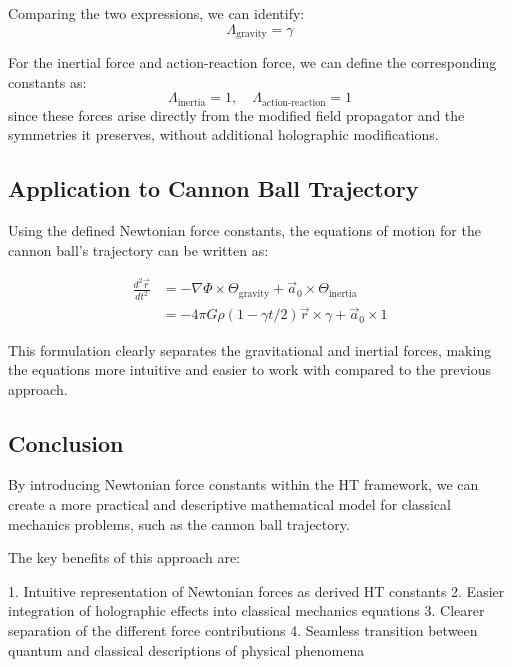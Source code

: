 \documentclass{article}
\theoremstyle{plain}
\theoremstyle{definition}
\theoremstyle{remark}
\begin{document}
Comparing the two expressions, we can identify:
\begin{equation}
\Lambda_\text{gravity} = \gamma
\end{equation}

For the inertial force and action-reaction force, we can define the corresponding constants as:
\begin{equation}
\Lambda_\text{inertia} = 1, \quad \Lambda_\text{action-reaction} = 1
\end{equation}
since these forces arise directly from the modified field propagator and the symmetries it preserves, without additional holographic modifications.

\subsection{Application to Cannon Ball Trajectory}

Using the defined Newtonian force constants, the equations of motion for the cannon ball's trajectory can be written as:

\begin{align}
\frac{d^2\vec{r}}{dt^2} &= -\nabla \Phi \times \Theta_{\text{gravity}} + \vec{a}_0 \times \Theta_{\text{inertia}} \\
                &= -4\pi G\rho(1 - \gamma t/2)\vec{r} \times \gamma + \vec{a}_0 \times 1
\end{align}

This formulation clearly separates the gravitational and inertial forces, making the equations more intuitive and easier to work with compared to the previous approach.

\subsection{Conclusion}

By introducing Newtonian force constants within the HT framework, we can create a more practical and descriptive mathematical model for classical mechanics problems, such as the cannon ball trajectory.

The key benefits of this approach are:

1. Intuitive representation of Newtonian forces as derived HT constants
2. Easier integration of holographic effects into classical mechanics equations
3. Clearer separation of the different force contributions
4. Seamless transition between quantum and classical descriptions of physical phenomena
\end{document}

